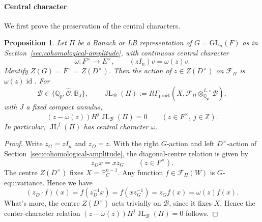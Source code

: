 \documentclass[11pt]{article}
\newtheorem{proposition}[theorem]{Proposition}
\theoremstyle{definition}
\newcommand{\Qp}{\mathbb Q_p}
\newcommand{\cF}{\mathcal F}
\newcommand{\proet}{\mathrm{pro\acute et}}
\newcommand{\JL}{\operatorname{JL}}
\begin{document}
\paragraph{Central character} We first prove the preservation of the central characters.

\begin{proposition}%
\label{prop:JL-central-character}
Let \(\Pi\) be a Banach or LB representation of
\(G=\mathrm{GL}_n(F)\) as in Section~\ref{sec:cohomological-amplitude},
with continuous central character
\begin{equation*}
 \omega:F^\times\longrightarrow E^\times,\qquad
 (zI_n)v=\omega(z)v.
\end{equation*}
Identify \(Z(G)=F^\times=Z(D^\times)\).  Then the action
of \(z\in Z(D^\times)\) on \(\cF_\Pi\) is
\(\omega(z)\operatorname{id}\).  For
\begin{equation*}
 \mathscr B\in\{\Qp,\widehat{\mathscr O},\mathbb B_J\},
 \qquad
 \JL_{\mathscr B}(\Pi):=
 R\Gamma_{\proet}\!\left(X,
       \cF_\Pi\otimes_{\Qp}^{L,\square}\mathscr B\right),
\end{equation*}
with \(J\) a fixed compact annulus,
\begin{equation*}
 (z-\omega(z))H^j\JL_{\mathscr B}(\Pi)=0
 \qquad(z\in F^\times,\ j\in\mathbb Z).
\end{equation*}
In particular, \(\JL^j(\Pi)\) has central character \(\omega\).
\end{proposition}

\begin{proof}
Write \(z_G=zI_n\) and \(z_D=z\).
With the right \(G\)-action and left \(D^\times\)-action of
Section~\ref{sec:cohomological-amplitude}, the diagonal-centre
relation \cite[proof of Theorem~8.1(2)]{TaylorBundles} is given by 
\begin{equation*}
 z_Dx=xz_G\qquad(z\in F^\times).
\end{equation*}
The centre $Z(D^\times)$ fixes \(X=\mathbb P_C^{n-1}\). Any function 
\(f\in\cF_\Pi(W)\) is \(G\)-equivariance. Hence we have
\begin{equation*}
 (z_D\cdot f)(x)
 =f(z_D^{-1}x)
 =f(xz_G^{-1})
 =z_Gf(x)
 =\omega(z)f(x).
\end{equation*}
What's more, the centre $Z(D^\times)$ acts trivially on \(\mathscr B\), since it fixes
\(X\).  Hence the center-character relation \((z-\omega(z))H^j\JL_{\mathscr B}(\Pi)=0\) follows.
\end{proof}
\end{document}
